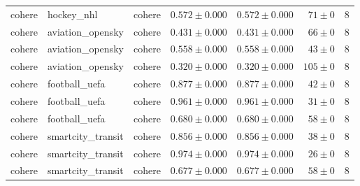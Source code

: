 \begin{table}[htbp]
\begin{tabular}{l l l r r r r}
cohere & hockey\_nhl & cohere & $0.572\pm0.000$ & $0.572\pm0.000$ & $71\pm0$ & 8 \\
cohere & aviation\_opensky & cohere & $0.431\pm0.000$ & $0.431\pm0.000$ & $66\pm0$ & 8 \\
cohere & aviation\_opensky & cohere & $0.558\pm0.000$ & $0.558\pm0.000$ & $43\pm0$ & 8 \\
cohere & aviation\_opensky & cohere & $0.320\pm0.000$ & $0.320\pm0.000$ & $105\pm0$ & 8 \\
cohere & football\_uefa & cohere & $0.877\pm0.000$ & $0.877\pm0.000$ & $42\pm0$ & 8 \\
cohere & football\_uefa & cohere & $0.961\pm0.000$ & $0.961\pm0.000$ & $31\pm0$ & 8 \\
cohere & football\_uefa & cohere & $0.680\pm0.000$ & $0.680\pm0.000$ & $58\pm0$ & 8 \\
cohere & smartcity\_transit & cohere & $0.856\pm0.000$ & $0.856\pm0.000$ & $38\pm0$ & 8 \\
cohere & smartcity\_transit & cohere & $0.974\pm0.000$ & $0.974\pm0.000$ & $26\pm0$ & 8 \\
cohere & smartcity\_transit & cohere & $0.677\pm0.000$ & $0.677\pm0.000$ & $58\pm0$ & 8 \\
\hline
\end{tabular}
\end{table}

